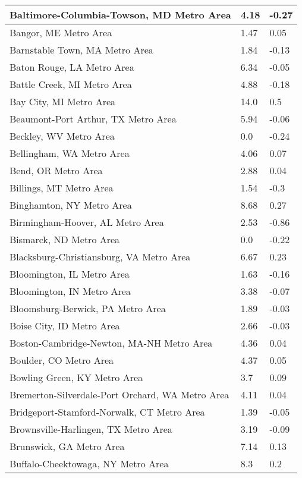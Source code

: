 \documentclass[12pt,oneside, letterpaper]{book}
\begin{document}
\begin{longtable}{| p{} | p{} | p{} |}
    Baltimore-Columbia-Towson, MD Metro Area & 4.18 & -0.27 \\ \hline
    Bangor, ME Metro Area & 1.47 & 0.05 \\ \hline
    Barnstable Town, MA Metro Area & 1.84 & -0.13 \\ \hline
    Baton Rouge, LA Metro Area & 6.34 & -0.05 \\ \hline
    Battle Creek, MI Metro Area & 4.88 & -0.18 \\ \hline
    Bay City, MI Metro Area & 14.0 & 0.5 \\ \hline
    Beaumont-Port Arthur, TX Metro Area & 5.94 & -0.06 \\ \hline
    Beckley, WV Metro Area & 0.0 & -0.24 \\ \hline
    Bellingham, WA Metro Area & 4.06 & 0.07 \\ \hline
    Bend, OR Metro Area & 2.88 & 0.04 \\ \hline
    Billings, MT Metro Area & 1.54 & -0.3 \\ \hline
    Binghamton, NY Metro Area & 8.68 & 0.27 \\ \hline
    Birmingham-Hoover, AL Metro Area & 2.53 & -0.86 \\ \hline
    Bismarck, ND Metro Area & 0.0 & -0.22 \\ \hline
    Blacksburg-Christiansburg, VA Metro Area & 6.67 & 0.23 \\ \hline
    Bloomington, IL Metro Area & 1.63 & -0.16 \\ \hline
    Bloomington, IN Metro Area & 3.38 & -0.07 \\ \hline
    Bloomsburg-Berwick, PA Metro Area & 1.89 & -0.03 \\ \hline
    Boise City, ID Metro Area & 2.66 & -0.03 \\ \hline
    Boston-Cambridge-Newton, MA-NH Metro Area & 4.36 & 0.04 \\ \hline
    Boulder, CO Metro Area & 4.37 & 0.05 \\ \hline
    Bowling Green, KY Metro Area & 3.7 & 0.09 \\ \hline
    Bremerton-Silverdale-Port Orchard, WA Metro Area & 4.11 & 0.04 \\ \hline
    Bridgeport-Stamford-Norwalk, CT Metro Area & 1.39 & -0.05 \\ \hline
    Brownsville-Harlingen, TX Metro Area & 3.19 & -0.09 \\ \hline
    Brunswick, GA Metro Area & 7.14 & 0.13 \\ \hline
    Buffalo-Cheektowaga, NY Metro Area & 8.3 & 0.2 \\ \hline

\end{longtable}
\end{document}
